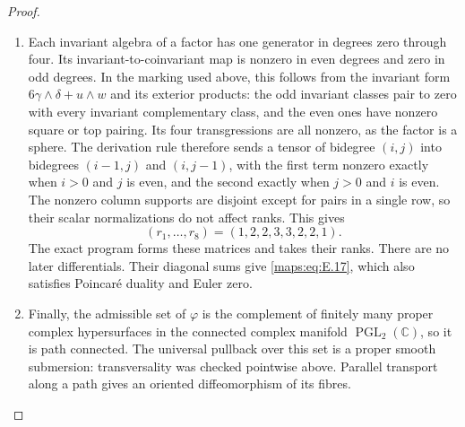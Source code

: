 \begin{proof}
\begin{enumerate}[label={$\langle1\rangle$\arabic*.},leftmargin=*]
\item Each invariant algebra of a factor has one generator in degrees
zero through four.  Its invariant-to-coinvariant map is nonzero
in even degrees and zero in odd degrees.  In the marking used
above, this follows from the invariant form
$6\gamma\wedge\delta+u\wedge w$ and its exterior products:
the odd invariant classes pair to zero with every invariant
complementary class, and the even ones have nonzero square or
top pairing.  Its four transgressions are all nonzero, as the
factor is a sphere.  The derivation rule therefore sends a tensor
of bidegree $(i,j)$ into bidegrees $(i-1,j)$ and $(i,j-1)$,
with the first term nonzero exactly when $i>0$ and $j$ is even,
and the second exactly when $j>0$ and $i$ is even.  The nonzero
column supports are disjoint except for pairs in a single row,
so their scalar normalizations do not affect ranks.  This gives
\[
 (r_1,\ldots,r_8)=(1,2,2,3,3,2,2,1).
\]
The exact program forms these matrices and takes their ranks.
There are no later differentials.  Their diagonal sums give
\eqref{maps:eq:E.17}, which also satisfies Poincar\'e duality and Euler zero.

\item Finally, the admissible set of $\varphi$ is the complement of
finitely many proper complex hypersurfaces in the connected
complex manifold $\operatorname{PGL}_2(\mathbb C)$, so it is
path connected.  The universal pullback over this set is a
proper smooth submersion: transversality was checked pointwise
above.  Parallel transport along a path gives an oriented
diffeomorphism of its fibres.
\end{enumerate}
\end{proof}


